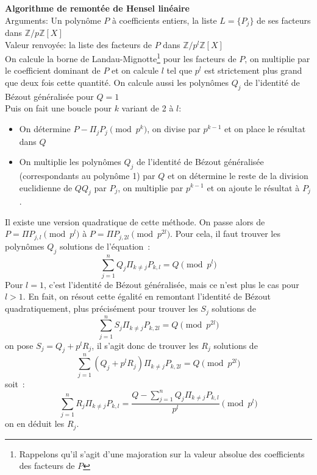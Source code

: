 \documentclass[a4paper,11pt]{article}
\newcommand{\Z}{{\mathbb{Z}}}
\begin{document}
{\bf Algorithme de remontée de Hensel linéaire}\\
Arguments: Un polynôme $P$ à coefficients entiers, la liste $L=\{ P_j \}$ 
de ses facteurs dans $\Z/p\Z[X]$\\
Valeur renvoyée: la liste des facteurs de $P$ dans $\Z/p^l \Z[X]$\\
On calcule la borne de Landau-Mignotte\footnote{Rappelons qu'il s'agit d'une
majoration sur la valeur absolue des coefficients des facteurs de $P$} 
pour les facteurs de $P$, on multiplie
par le coefficient dominant de $P$ et on calcule $l$ tel que $p^l$ est
strictement plus grand que deux fois cette quantité. On calcule
aussi les polynômes $Q_j$ de l'identité de Bézout généralisée pour $Q=1$\\
Puis on fait une boucle pour $k$ variant de 2 à $l$:
\begin{itemize}
\item On détermine $P-\Pi_j P_j \pmod {p^{k}}$, on divise par $p^{k-1}$
et on place le résultat dans $Q$
\item On multiplie les polynômes $Q_j$ de l'identité de Bézout 
généralisée (correspondants au polynôme 1) par $Q$
et on détermine le reste de la division euclidienne de $Q Q_j$ par $P_j$,
on multiplie par $p^{k-1}$ et on ajoute le résultat à $P_j$.
\end{itemize}

Il existe une version quadratique de cette méthode. On passe alors de
$P=\Pi P_{j,l} \pmod {p^l}$ à $P=\Pi P_{j,2l} \pmod {p^{2l}}$. Pour
cela, il faut trouver les polynômes $Q_j$ solutions de l'équation~:
\[ \sum_{j=1}^n Q_j \Pi_{k\neq j} P_{k,l}=Q \pmod {p^l}\]
Pour $l=1$, c'est l'identité de Bézout généralisée, mais ce n'est plus le
cas pour $l>1$. En fait, on résout cette égalité en remontant l'identité
de Bézout quadratiquement, plus précisément pour trouver les $S_j$
solutions de
\[ \sum_{j=1}^n S_j \Pi_{k\neq j} P_{k,2l}=Q \pmod {p^{2l}}\]
on pose $S_j=Q_j+p^l R_j$, il s'agit donc de trouver les $R_j$ solutions de
\[ \sum_{j=1}^n (Q_j+p^l R_j) \Pi_{k\neq j} P_{k,2l}=Q \pmod {p^{2l}}\]
soit~:
\[ \sum_{j=1}^n R_j \Pi_{k\neq j} P_{k,l}
=\frac{Q-\sum_{j=1}^n Q_j \Pi_{k\neq j} P_{k,l} }{p^l} \pmod {p^l}\]
on en déduit les $R_j$.
\end{document}
